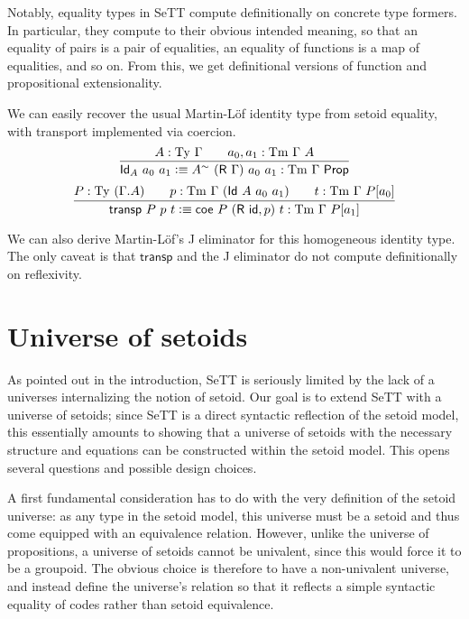 \documentclass[autoref]{llncs}
\newcommand{\GG}{\Gamma}
\newcommand{\R}{\textsf{R}}
\newcommand{\Id}{\textsf{Id}}
\newcommand{\coe}{\textsf{coe}}
\newcommand{\tyj}[2]{#2 : \Ty\ #1}
\newcommand{\tmj}[3]{#2 : \Tm\ #1\ #3}
\newcommand{\Prop}{\textsf{Prop}}
\newcommand{\Ty}{\mathrm{Ty}}
\newcommand{\Tm}{\mathrm{Tm}}
\newcommand{\defeq}{\mathrel{\vcentcolon\equiv}}
\begin{document}
Notably, equality types in SeTT compute definitionally on concrete type
formers. In particular, they compute to their obvious intended meaning, so that
an equality of pairs is a pair of equalities, an equality of functions is a map
of equalities, and so on. From this, we get definitional versions of function
and propositional extensionality.

We can easily recover the usual Martin-L\"of identity type from setoid equality,
with transport implemented via coercion.
\[
\infer{
  \textsf{Id}_A\ a_0\ a_1 \defeq A^{\sim}\ (\R\ \GG)\ a_0\ a_1 : \Tm\ \GG\ \Prop
}{
  \tyj{\GG}{A} \qquad \tmj{\GG}{a_0, a_1}{A}
}
\]
\[
\infer{
  \textsf{transp}\ P\ p\ t \defeq
    \coe\ P\ (\textsf{R}\ \textsf{id} , p)\ t : \Tm\ \GG\ P[a_1]
}{
  P : \Ty\ (\GG . A)
  \qquad
  p : \Tm\ \GG\ (\Id\ A\ a_0\ a_1)
  \qquad
  t : \Tm\ \GG\ P[a_0]
}
\]

We can also derive Martin-L\"of's J eliminator for this homogeneous identity
type. The only caveat is that $\textsf{transp}$ and the J eliminator do not
compute definitionally on reflexivity.

\section{Universe of setoids}\label{setoid-universe}

As pointed out in the introduction, SeTT is seriously limited by the lack of a
universes internalizing the notion of setoid. Our goal is to extend SeTT with a
universe of setoids; since SeTT is a direct syntactic reflection of the setoid
model, this essentially amounts to showing that a universe of setoids with the
necessary structure and equations can be constructed within the setoid
model. This opens several questions and possible design choices.

A first fundamental consideration has to do with the very definition of the setoid
universe: as any type in the setoid model, this universe must be a setoid and
thus come equipped with an equivalence relation. However, unlike the universe of
propositions, a universe of setoids cannot be univalent, since this would force
it to be a groupoid. The obvious choice is therefore to have a non-univalent
universe, and instead define the universe's relation so that it reflects a
simple syntactic equality of codes rather than setoid equivalence.
\end{document}
